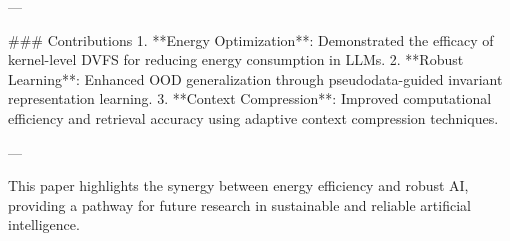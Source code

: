 ---

### Contributions
1. **Energy Optimization**: Demonstrated the efficacy of kernel-level DVFS for reducing energy consumption in LLMs.
2. **Robust Learning**: Enhanced OOD generalization through pseudodata-guided invariant representation learning.
3. **Context Compression**: Improved computational efficiency and retrieval accuracy using adaptive context compression techniques.

--- 

This paper highlights the synergy between energy efficiency and robust AI, providing a pathway for future research in sustainable and reliable artificial intelligence.